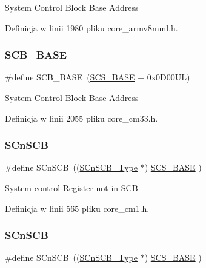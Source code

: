 System Control Block Base Address 

Definicja w linii 1980 pliku core\+\_\+armv8mml.\+h.

\mbox{\label{group___c_m_s_i_s__core__base_gad55a7ddb8d4b2398b0c1cfec76c0d9fd}} 
\subsubsection{\texorpdfstring{S\+C\+B\+\_\+\+B\+A\+SE}{SCB\_BASE}\hspace{0.1cm}{\footnotesize\ttfamily [12/12]}}
{\footnotesize\ttfamily \#define S\+C\+B\+\_\+\+B\+A\+SE~(\hyperlink{group___c_m_s_i_s__core__base_ga3c14ed93192c8d9143322bbf77ebf770}{S\+C\+S\+\_\+\+B\+A\+SE} +  0x0\+D00\+U\+L)}

System Control Block Base Address 

Definicja w linii 2055 pliku core\+\_\+cm33.\+h.

\mbox{\label{group___c_m_s_i_s__core__base_ga9fe0cd2eef83a8adad94490d9ecca63f}} 
\subsubsection{\texorpdfstring{S\+Cn\+S\+CB}{SCnSCB}\hspace{0.1cm}{\footnotesize\ttfamily [1/8]}}
{\footnotesize\ttfamily \#define S\+Cn\+S\+CB~((\hyperlink{struct_s_cn_s_c_b___type}{S\+Cn\+S\+C\+B\+\_\+\+Type}    $\ast$)     \hyperlink{group___c_m_s_i_s__core__base_ga3c14ed93192c8d9143322bbf77ebf770}{S\+C\+S\+\_\+\+B\+A\+SE}      )}

System control Register not in S\+CB 

Definicja w linii 565 pliku core\+\_\+cm1.\+h.

\mbox{\label{group___c_m_s_i_s__core__base_ga9fe0cd2eef83a8adad94490d9ecca63f}} 
\subsubsection{\texorpdfstring{S\+Cn\+S\+CB}{SCnSCB}\hspace{0.1cm}{\footnotesize\ttfamily [2/8]}}
{\footnotesize\ttfamily \#define S\+Cn\+S\+CB~((\hyperlink{struct_s_cn_s_c_b___type}{S\+Cn\+S\+C\+B\+\_\+\+Type}    $\ast$)     \hyperlink{group___c_m_s_i_s__core__base_ga3c14ed93192c8d9143322bbf77ebf770}{S\+C\+S\+\_\+\+B\+A\+SE}      )}

